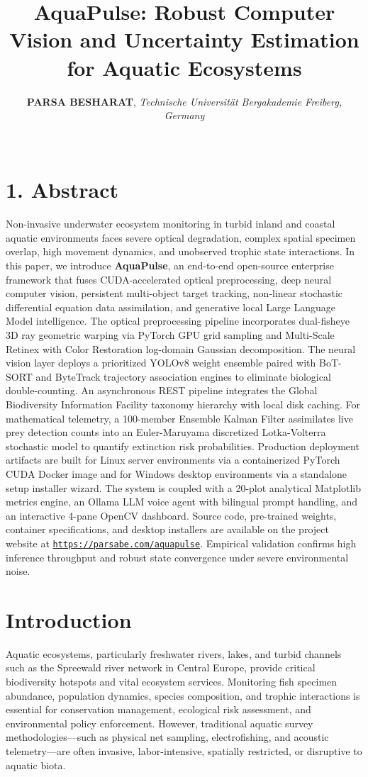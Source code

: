 \documentclass[11pt,a4paper]{article}
\title{\vspace{-0.5cm}\textbf{\huge AquaPulse: Robust Computer Vision and Uncertainty Estimation for Aquatic Ecosystems}}
\author{\textbf{\large PARSA BESHARAT}, \textit{Technische Universität Bergakademie Freiberg, Germany}\\[0.15cm]
\urltext{parsabe99@gmail.com}\\[0.05cm]
\urltext{https://parsabe.com/aquapulse}}
\date{}
\newcommand{\urltext}[1]{{\color{linkblue}\underline{\texttt{#1}}}}
\begin{document}
\maketitle

\section*{1. Abstract}
Non-invasive underwater ecosystem monitoring in turbid inland and coastal aquatic environments faces severe optical degradation, complex spatial specimen overlap, high movement dynamics, and unobserved trophic state interactions. In this paper, we introduce \textbf{AquaPulse}, an end-to-end open-source enterprise framework that fuses CUDA-accelerated optical preprocessing, deep neural computer vision, persistent multi-object target tracking, non-linear stochastic differential equation data assimilation, and generative local Large Language Model intelligence. The optical preprocessing pipeline incorporates dual-fisheye 3D ray geometric warping via PyTorch GPU grid sampling and Multi-Scale Retinex with Color Restoration log-domain Gaussian decomposition. The neural vision layer deploys a prioritized YOLOv8 weight ensemble paired with BoT-SORT and ByteTrack trajectory association engines to eliminate biological double-counting. An asynchronous REST pipeline integrates the Global Biodiversity Information Facility taxonomy hierarchy with local disk caching. For mathematical telemetry, a 100-member Ensemble Kalman Filter assimilates live prey detection counts into an Euler-Maruyama discretized Lotka-Volterra stochastic model to quantify extinction risk probabilities. Production deployment artifacts are built for Linux server environments via a containerized PyTorch CUDA Docker image and for Windows desktop environments via a standalone setup installer wizard. The system is coupled with a 20-plot analytical Matplotlib metrics engine, an Ollama LLM voice agent with bilingual prompt handling, and an interactive 4-pane OpenCV dashboard. Source code, pre-trained weights, container specifications, and desktop installers are available on the project website at \urltext{https://parsabe.com/aquapulse}. Empirical validation confirms high inference throughput and robust state convergence under severe environmental noise.

\vspace{0.3cm}

\section{Introduction}
Aquatic ecosystems, particularly freshwater rivers, lakes, and turbid channels such as the Spreewald river network in Central Europe, provide critical biodiversity hotspots and vital ecosystem services. Monitoring fish specimen abundance, population dynamics, species composition, and trophic interactions is essential for conservation management, ecological risk assessment, and environmental policy enforcement. However, traditional aquatic survey methodologies—such as physical net sampling, electrofishing, and acoustic telemetry—are often invasive, labor-intensive, spatially restricted, or disruptive to aquatic biota.
\end{document}
